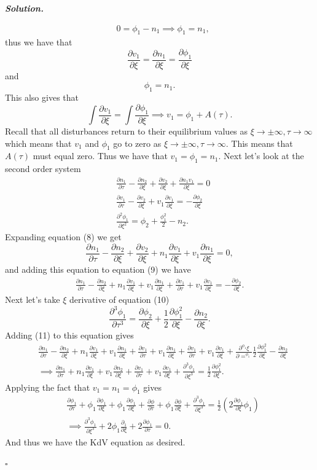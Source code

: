 \documentclass[12pt]{report}
\newenvironment{solution}[1][\it{Solution}]{\textbf{#1. } }{$\square$}
\newcommand{\paren}[1]{{\left(#1\right)}} %
\newcommand{\pp}[2]{\frac{\partial #1}{\partial #2}} %
\newcommand{\ppn}[3]{\frac{\partial^{#1} #2}{\partial #3^{#1}}} %
\begin{document}
\begin{solution}
\begin{enumerate}
\begin{align*}
        &0 = \phi_1 - n_1 \implies \phi_1 = n_1,
    \end{align*} 
    thus we have that 
    \[
    \pp{v_1}{\xi} = \pp{n_1}{\xi} = \pp{\phi_1}{\xi}
    \] 
    and 
    \[
    \phi_1 = n_1.
    \] 
    This also gives that
    \[
        \int \pp{v_1}{\xi} = \int \pp{\phi_1}{\xi} \implies v_1 = \phi_1 + A(\tau).
    \]
    Recall that all disturbances return to their equilibrium values as $\xi \to \pm \infty, \tau \to \infty$ which means that $v_1$ and $\phi_1$ go to zero as $\xi \to \pm \infty, \tau \to \infty$. This means that $A(\tau)$ must equal zero. Thus we have that $v_1 = \phi_1 = n_1.$ Next let's look at the second order system
    \begin{align}
        &\pp{n_1}{\tau} - \pp{n_2}{\xi} + \pp{v_2}{\xi} + \pp{n_1v_1}{\xi} = 0\\
        &\pp{v_1}{\tau} - \pp{v_2}{\xi} + v_1 \pp{v_1}{\xi} = - \pp{\phi_2}{\xi}\\
        &\ppn{2}{\phi_1}{\xi} = \phi_2 + \frac{\phi_1^2}{2} - n_2.
    \end{align}
    Expanding equation (8) we get
    \[
        \pp{n_1}{\tau} - \pp{n_2}{\xi} + \pp{v_2}{\xi} + n_1\pp{v_1}{\xi} + v_1 \pp{n_1}{\xi}= 0,
    \]
    and adding this equation to equation (9) we have
    \begin{align}
        \pp{n_1}{\tau} - \pp{n_2}{\xi} + n_1\pp{v_1}{\xi} + v_1\pp{n_1}{\xi} + \pp{v_1}{\tau} + v_1\pp{v_1}{\xi} = -\pp{\phi_2}{\xi}.
    \end{align}
    Next let's take $\xi$ derivative of equation (10)
    \[
        \ppn{3}{\phi_1}{\tau} = \pp{\phi_2}{\xi} + \frac{1}{2}\pp{\phi_1^2}{\xi} - \pp{n_2}{\xi}.
    \]
    Adding (11) to this equation gives
    \begin{align*}
        &\pp{n_1}{\tau} - \pp{n_2}{\xi} + n_1 \pp{v_1}{\xi} + v_1 \pp{n_1}{\xi} + \pp{v_1}{\tau} + v_1 \pp{n_1}{\xi} + \pp{v_1}{\tau} + v_1\pp{v_1}{\xi} + \ppn{\phi_1}{\xi} = \frac{1}{2} \pp{\phi_1^2}{\xi} - \pp{n_2}{\xi}\\
        &\implies \pp{n_1}{\tau} + n_1 \pp{v_1}{\xi} + v_1 \pp{n_2}{\xi} + \pp{v_1}{\tau} + v_1\pp{v_1}{\xi} + \ppn{3}{\phi_1}{\xi} = \frac{1}{2}\pp{\phi_1^2}{\xi}.
    \end{align*}
    Applying the fact that $v_1 = n_1 = \phi_1$ gives
    \begin{align*}
        &\pp{\phi_1}{\tau} + \phi_1 \pp{\phi_1}{\xi} + \phi_1\pp{\phi_1}{\xi} + \pp{\phi}{\tau} + \phi_1 \pp{\phi}{\xi} + \ppn{3}{\phi_1}{\xi} = \frac{1}{2}\paren{2 \pp{\phi_1}{\xi}\phi_1}\\
        &\implies \ppn{3}{\phi_1}{\xi} + 2\phi_1 \pp{_1}{\xi} + 2\pp{\phi_1}{\tau} = 0.
    \end{align*}
    And thus we have the KdV equation as desired. 
\end{enumerate}

\end{solution}
\end{document}
